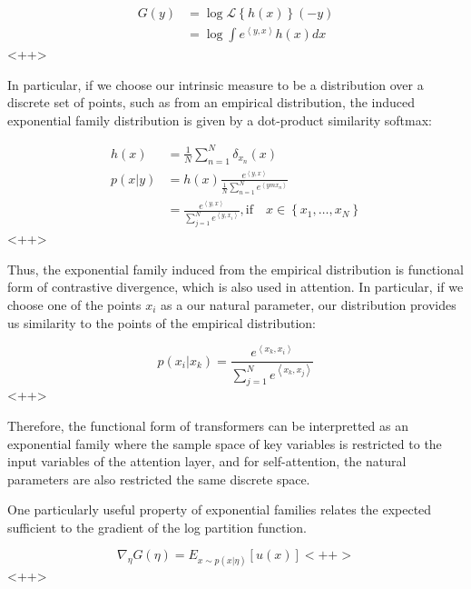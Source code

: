 \documentclass[a4paper]{article}
\begin{document}
\begin{equation}
  \begin{split}
    G(y) &= \log \mathcal{L}\left\{ h(x) \right\}(-y) \\
    &= \log \int e^{ \left< y, x \right> } h(x) dx
  \end{split}
  \label{<++>}
\end{equation}<++>

In particular, if we choose our intrinsic measure to be a distribution over a discrete set of points, such as from an empirical distribution, the induced exponential family distribution is given by a dot-product similarity softmax:

\begin{equation}
  \begin{split}
    h(x) &= \frac{1}{N} \sum_{n=1}^N \delta_{x_n}(x) \\
    p(x \vert y) &= h(x) \frac{e^{\left<y,x \right>}}{\frac{1}{N}\sum_{n=1}^N e^{\left<ymx_n \right>}} \\
    &= \frac{e^{\left<y,x \right>}}{\sum_{j=1}^N e^{\left<y,x_i\right>}}, \text{if} \quad x \in \left\{ x_1,\ldots,x_N \right\}
  \end{split}
  \label{<++>}
\end{equation}<++>

Thus, the exponential family induced from the empirical distribution is functional form of contrastive divergence, which is also used in attention.  In particular, if we choose one of the points $x_i$ as a our natural parameter, our distribution provides us similarity to the points of the empirical distribution:

\begin{equation}
  p(x_i \vert x_k) = \frac{ e^{\left<x_k,x_i\right>}}{\sum_{j=1}^N e^{\left< x_k,x_j\right>} }
  \label{<++>}
\end{equation}<++>

Therefore, the functional form of transformers can be interpretted as an exponential family where the sample space of key variables is restricted to the input variables of the attention layer, and for self-attention, the natural parameters are also restricted the same discrete space.

One particularly useful property of exponential families relates the expected sufficient to the gradient of the log partition function.

\begin{equation}
  \nabla_{\eta} G(\eta) = E_{x \sim p(x \vert \eta)} \left[ u(x) \right]<++>
  \label{<++>}
\end{equation}<++>
\end{document}
